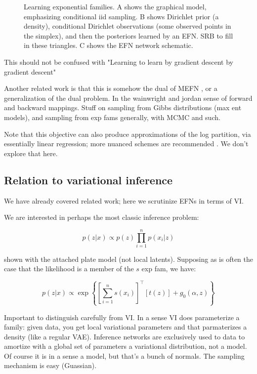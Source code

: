 \documentclass{article}
\begin{document}
 \begin{figure}
  \centering

  \caption{Learning exponential families.  A shows the graphical model, emphasizing conditional iid sampling.  B shows Dirichlet prior (a density), conditional Dirichlet observations (some observed points in the simplex), and then the posteriors learned by an EFN.  SRB to fill in these triangles.   C shows the EFN network schematic.}
\end{figure}

This should not be confused with "Learning to learn by gradient descent by gradient descent" \cite{andrychowicz2016learning} 

Another related work is that this is somehow the dual of MEFN \cite{loaiza2017maximum}, or a generalization of the dual problem.  In the wainwright and jordan sense of forward and backward mappings.
Stuff on sampling from Gibbs distributions (max ent models), and sampling from exp fams generally, with MCMC and such.

Note that this objective can also produce approximations of the log partition, via essentially linear regression; more nuanced schemes are recommended \cite{papamakarios2015distilling}.  We don't explore that here.


 \subsection{Relation to variational inference}
 
 We have already covered related work; here we scrutinize EFNs in terms of VI.
 
We are interested in perhaps the most classic inference problem:

$$p(z | x) \propto p(z) \prod_{i=1}^n p(x_i | z)$$

 shown with the attached plate model (not local latents).  Supposing as is often the case that the likelihood is a member of the $s$ exp fam, we have:
 
 $$p(z | x ) \propto \exp\left\{ \left[ \sum_{i=1}^n s(x_i) \right]^\top\left[ t(z) \right] + g_0(\alpha,z) \right\}$$
 
 Important to distinguish carefully from VI.  In a sense VI does parameterize a family: given data, you get local variational parameters and that parmaterizes a density (like a regular VAE).  Inference networks are exclusively used to data to amortize with a global set of parameters a variational distribution, not a model.  Of course it is in a sense a model, but that's a bunch of normals.  The sampling mechanism is easy (Guassian).  
 
\end{document}

